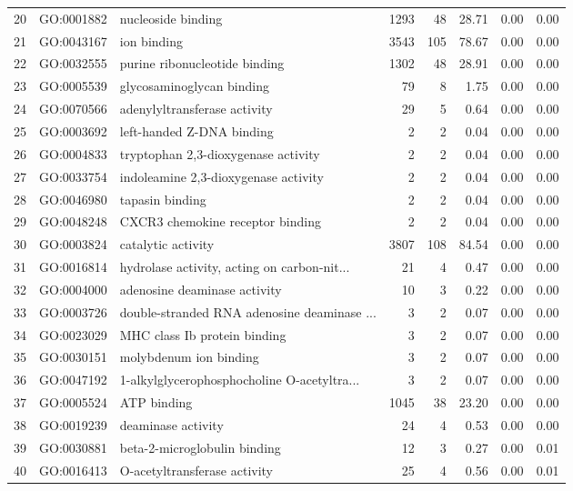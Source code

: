 \begin{table}[ht]
\begin{tabular}{rllrrrrr}
  20 & GO:0001882 & nucleoside binding & 1293 &  48 & 28.71 & 0.00 & 0.00 \\ 
  21 & GO:0043167 & ion binding & 3543 & 105 & 78.67 & 0.00 & 0.00 \\ 
  22 & GO:0032555 & purine ribonucleotide binding & 1302 &  48 & 28.91 & 0.00 & 0.00 \\ 
  23 & GO:0005539 & glycosaminoglycan binding &  79 &   8 & 1.75 & 0.00 & 0.00 \\ 
  24 & GO:0070566 & adenylyltransferase activity &  29 &   5 & 0.64 & 0.00 & 0.00 \\ 
  25 & GO:0003692 & left-handed Z-DNA binding &   2 &   2 & 0.04 & 0.00 & 0.00 \\ 
  26 & GO:0004833 & tryptophan 2,3-dioxygenase activity &   2 &   2 & 0.04 & 0.00 & 0.00 \\ 
  27 & GO:0033754 & indoleamine 2,3-dioxygenase activity &   2 &   2 & 0.04 & 0.00 & 0.00 \\ 
  28 & GO:0046980 & tapasin binding &   2 &   2 & 0.04 & 0.00 & 0.00 \\ 
  29 & GO:0048248 & CXCR3 chemokine receptor binding &   2 &   2 & 0.04 & 0.00 & 0.00 \\ 
  30 & GO:0003824 & catalytic activity & 3807 & 108 & 84.54 & 0.00 & 0.00 \\ 
  31 & GO:0016814 & hydrolase activity, acting on carbon-nit... &  21 &   4 & 0.47 & 0.00 & 0.00 \\ 
  32 & GO:0004000 & adenosine deaminase activity &  10 &   3 & 0.22 & 0.00 & 0.00 \\ 
  33 & GO:0003726 & double-stranded RNA adenosine deaminase ... &   3 &   2 & 0.07 & 0.00 & 0.00 \\ 
  34 & GO:0023029 & MHC class Ib protein binding &   3 &   2 & 0.07 & 0.00 & 0.00 \\ 
  35 & GO:0030151 & molybdenum ion binding &   3 &   2 & 0.07 & 0.00 & 0.00 \\ 
  36 & GO:0047192 & 1-alkylglycerophosphocholine O-acetyltra... &   3 &   2 & 0.07 & 0.00 & 0.00 \\ 
  37 & GO:0005524 & ATP binding & 1045 &  38 & 23.20 & 0.00 & 0.00 \\ 
  38 & GO:0019239 & deaminase activity &  24 &   4 & 0.53 & 0.00 & 0.00 \\ 
  39 & GO:0030881 & beta-2-microglobulin binding &  12 &   3 & 0.27 & 0.00 & 0.01 \\ 
  40 & GO:0016413 & O-acetyltransferase activity &  25 &   4 & 0.56 & 0.00 & 0.01 \\ 

\end{tabular}
\end{table}
